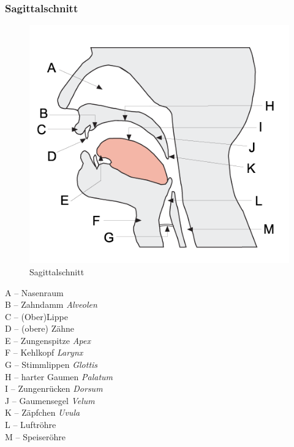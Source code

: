 \begin{frame}
\frametitle{Sagittalschnitt}

\begin{minipage}{0.48\textwidth}
	\begin{figure}
	\centering
	\includegraphics[scale=0.32]{material/04phonoatonomy}
	\caption{Sagittalschnitt}
	\end{figure}
\end{minipage}\hfill
\begin{minipage}{0.4\textwidth}
	A -- Nasenraum\\
	B -- Zahndamm \emph{Alveolen}\\
	C -- (Ober)Lippe \\
	D -- (obere) Zähne\\
	E -- Zungenspitze \emph{Apex}\\
	F -- Kehlkopf \emph{Larynx}\\
	G -- Stimmlippen \emph{Glottis}\\
	H -- harter Gaumen \emph{Palatum}\\
	I -- Zungenrücken \emph{Dorsum}\\
	J -- Gaumensegel \emph{Velum}\\
	K -- Zäpfchen \emph{Uvula}\\
	L -- Luftröhre\\ 
	M -- Speiseröhre
\end{minipage}
	
%		
	
\end{frame}


